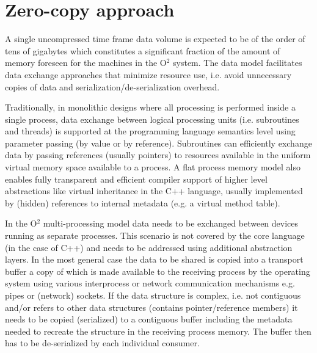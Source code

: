 \documentclass[a4paper,twoside]{article}
\def\O2{O$^2$}
\begin{document}
%

\section{Zero-copy approach}

A single uncompressed time frame data volume is expected to be of the order of tens of gigabytes which constitutes a significant fraction of the amount of memory foreseen for the machines in the \O2 system. The data model facilitates data exchange approaches that minimize resource use, i.e. avoid unnecessary copies of data and serialization/de-serialization overhead.

Traditionally, in monolithic designs where all processing is performed inside a single process, data exchange between logical processing units (i.e. subroutines and threads) is supported at the programming language semantics level using parameter passing (by value or by reference).
Subroutines can efficiently exchange data by passing references (usually pointers) to resources available in the uniform virtual memory space available to a process.
A flat process memory model also enables fully transparent and efficient compiler support of higher level abstractions like virtual inheritance in the C++ language, usually implemented by (hidden) references to internal metadata (e.g. a virtual method table).

In the \O2 multi-processing model data needs to be exchanged between devices running as separate processes. This scenario is not covered by the core language (in the case of C++) and needs to be addressed using additional abstraction layers. In the most general case the data to be shared is copied into a transport buffer a copy of which is made available to the receiving process by the operating system using various interprocess or network communication mechanisms e.g. pipes or (network) sockets. 
If the data structure is complex, i.e. not contiguous and/or refers to other data structures (contains pointer/reference members) it needs to be copied (serialized) to a contiguous buffer including the metadata needed to recreate the structure in the receiving process memory.
The buffer then has to be de-serialized by each individual consumer.
\end{document}
